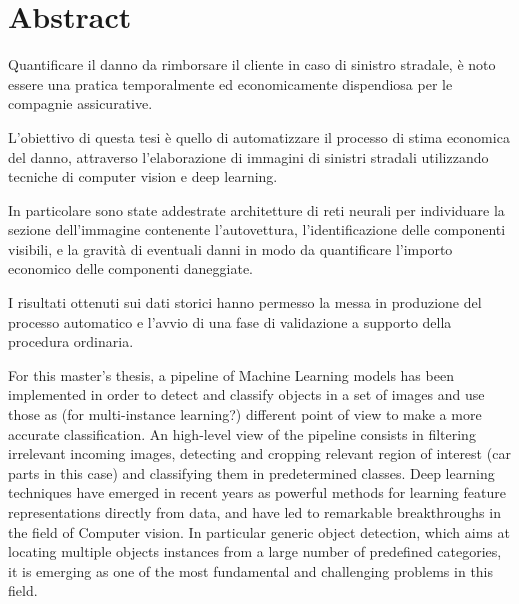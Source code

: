 


\chapter*{Abstract}
Quantificare il danno da rimborsare il cliente in caso di sinistro stradale, è noto essere una pratica temporalmente ed economicamente dispendiosa per le compagnie assicurative.

L'obiettivo di questa tesi è quello di automatizzare il processo di stima economica del danno, attraverso l'elaborazione di immagini di sinistri stradali utilizzando tecniche di computer vision e deep learning. 

In particolare sono state addestrate architetture di reti neurali per individuare la sezione dell'immagine contenente l'autovettura, l'identificazione delle componenti visibili, e la gravità di eventuali danni in modo da quantificare l'importo economico delle componenti daneggiate.

I risultati ottenuti sui dati storici hanno permesso la messa in produzione del processo automatico e l'avvio di una fase di validazione a supporto della procedura ordinaria.





For this master's thesis, a pipeline of Machine Learning models has been implemented in order to detect and classify objects in a set of images and use those as (for multi-instance learning?) different point of view to make a more accurate classification. An high-level view of the pipeline consists in filtering irrelevant incoming images, detecting and cropping relevant region of interest (car parts in this case) and classifying them in predetermined classes. Deep learning techniques have emerged in recent years as powerful methods for learning feature representations directly from data, and have led to remarkable breakthroughs in the field of Computer vision. In particular generic object detection, which aims at locating multiple objects instances from a large number of predefined categories, it is emerging as one of the most fundamental and challenging problems in this field. 

